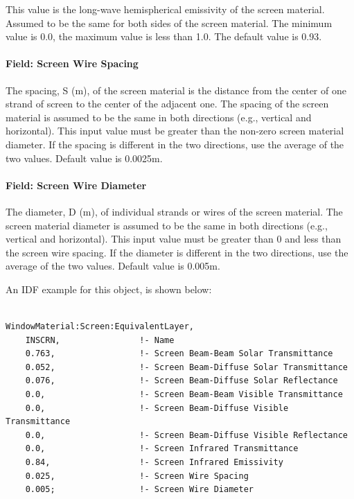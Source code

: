 This value is the long-wave hemispherical emissivity of the screen material. Assumed to be the same for both sides of the screen material. The minimum value is 0.0, the maximum value is less than 1.0. The default value is 0.93.

\paragraph{Field: Screen Wire Spacing}\label{field-screen-wire-spacing}

The spacing, S (m), of the screen material is the distance from the center of one strand of screen to the center of the adjacent one. The spacing of the screen material is assumed to be the same in both directions (e.g., vertical and horizontal). This input value must be greater than the non-zero screen material diameter. If the spacing is different in the two directions, use the average of the two values. Default value is 0.0025m.

\paragraph{Field: Screen Wire Diameter}\label{field-screen-wire-diameter}

The diameter, D (m), of individual strands or wires of the screen material. The screen material diameter is assumed to be the same in both directions (e.g., vertical and horizontal). This input value must be greater than 0 and less than the screen wire spacing. If the diameter is different in the two directions, use the average of the two values. Default value is 0.005m.

An IDF example for this object, is shown below:

\begin{lstlisting}

WindowMaterial:Screen:EquivalentLayer,
    INSCRN,                !- Name
    0.763,                 !- Screen Beam-Beam Solar Transmittance
    0.052,                 !- Screen Beam-Diffuse Solar Transmittance
    0.076,                 !- Screen Beam-Diffuse Solar Reflectance
    0.0,                   !- Screen Beam-Beam Visible Transmittance
    0.0,                   !- Screen Beam-Diffuse Visible Transmittance
    0.0,                   !- Screen Beam-Diffuse Visible Reflectance
    0.0,                   !- Screen Infrared Transmittance
    0.84,                  !- Screen Infrared Emissivity
    0.025,                 !- Screen Wire Spacing
    0.005;                 !- Screen Wire Diameter
\end{lstlisting}

